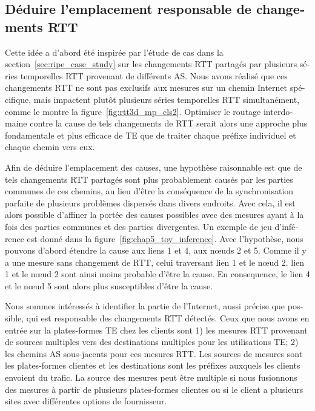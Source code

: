\begin{otherlanguage}{french}
\section{Déduire l'emplacement responsable de changements RTT}
Cette idée a d'abord été inspirée par l'étude de cas dans la section~\ref{sec:ripe_case_study} sur les changements RTT partagés par plusieurs séries temporelles RTT provenant de différents AS.
Nous avons réalisé que ces changements RTT ne sont pas exclusifs aux mesures sur un chemin Internet spécifique, 
mais impactent plutôt plusieurs séries temporelles RTT simultanément, comme le montre la figure~\ref {fig:rtt3d_mp_cls2}.
Optimiser le routage interdomaine contre la cause de tels changements de RTT serait alors une approche plus fondamentale et plus efficace de TE que de traiter chaque préfixe individuel et chaque chemin vers eux.

Afin de déduire l'emplacement des causes, une hypothèse raisonnable est que de tels changements RTT partagés sont plus probablement causés par les parties communes de ces chemins, 
au lieu d'être la conséquence de la synchronisation parfaite de plusieurs problèmes dispersés dans divers endroits.
Avec cela, il est alors possible d'affiner la portée des causes possibles avec des mesures ayant à la fois des parties communes et des parties divergentes.
Un exemple de jeu d'inférence est donné dans la figure~\ref{fig:chap5_toy_inference}.
Avec l'hypothèse, nous pouvons d'abord étendre la cause aux liens 1 et 4, aux nœuds 2 et 5.
Comme il y a une mesure sans changement de RTT, celui traversant lien 1 et le nœud 2.
lien 1 et le nœud 2 sont ainsi moins probable d'être la cause.
En consequence, le lien 4 et le nœud 5 sont alors plus susceptibles d'être la cause.

Nous sommes intéressés à identifier la partie de l'Internet, aussi précise que possible, qui est responsable des changements RTT détectés.
Ceux que nous avons en entrée sur la plates-formes TE chez les clients sont 1) les mesures RTT provenant de sources multiples vers des destinations multiples pour les utilisations TE; 
2) les chemins AS sous-jacents pour ces mesures RTT.
Les sources de mesures sont les plates-formes clientes et les destinations sont les préfixes auxquels les clients envoient du trafic.
La source des mesures peut être multiple si nous fusionnons des mesures à partir de plusieurs plates-formes clientes ou si le client a plusieurs sites avec différentes options de fournisseur.


\end{otherlanguage}
